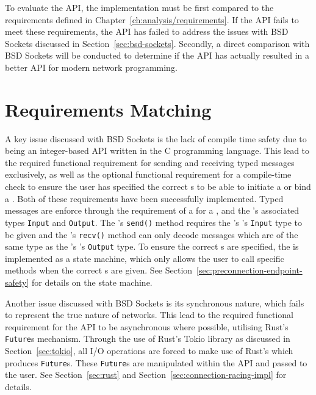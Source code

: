 To evaluate the API, the implementation must be first compared to the requirements defined in
Chapter~\ref{ch:analysis/requirements}.
If the API fails to meet these requirements, the API has failed to address the issues with BSD Sockets discussed in
Section~\ref{sec:bsd-sockets}.
Secondly, a direct comparison with BSD Sockets will be conducted to determine if the API has actually resulted in a
better API for modern network programming.

\section{Requirements Matching}\label{sec:requirements-matching}
A key issue discussed with BSD Sockets is the lack of compile time safety due to being an integer-based API written in
the C programming language.
This lead to the required functional requirement for sending and receiving typed messages exclusively, as well as the
optional functional requirement for a compile-time check to ensure the user has specified the correct \Endpoint{}s to
be able to initiate a \connection{} or bind a \listener{}.
Both of these requirements have been successfully implemented.
Typed messages are enforce through the requirement of a \framer{} for a \connection{}, and the \framer{}'s associated
types \texttt{Input} and \texttt{Output}.
The \connection{}'s \texttt{send()} method requires the \connection{}'s \framer{}'s \texttt{Input} type to be given and
the \connection{}'s \texttt{recv()} method can only decode messages which are of the same type as the \connection{}'s
\framer{}'s \texttt{Output} type.
To ensure the correct \Endpoint{}s are specified, the \preconnection{} is implemented as a state machine, which only
allows the user to call specific methods when the correct \Endpoint{}s are given.
See Section~\ref{sec:preconnection-endpoint-safety} for details on the state machine.

Another issue discussed with BSD Sockets is its synchronous nature, which fails to represent the true nature of
networks.
This lead to the required functional requirement for the API to be asynchronous where possible, utilising Rust's
\texttt{Future}s mechanism.
Through the use of Rust's Tokio library as discussed in Section~\ref{sec:tokio}, all I/O operations are forced to make
use of Rust's \asyncawait{} which produces \texttt{Future}s.
These \texttt{Future}s are manipulated within the API and passed to the user.
See Section~\ref{sec:rust} and Section~\ref{sec:connection-racing-impl} for details.

